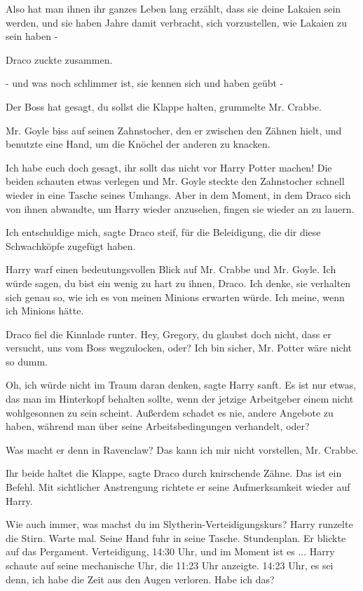 \glqq{}Also hat man ihnen ihr ganzes Leben lang erzählt, dass sie deine Lakaien
sein werden, und sie haben Jahre damit verbracht, sich vorzustellen, wie Lakaien
zu sein haben -\grqq{}

Draco zuckte zusammen.

\glqq{}- und was noch schlimmer ist, sie kennen sich und haben geübt -\grqq{}

\glqq{}Der Boss hat gesagt, du sollst die Klappe halten\grqq{}, grummelte Mr.
Crabbe.

Mr. Goyle biss auf seinen Zahnstocher, den er zwischen den Zähnen hielt, und
benutzte eine Hand, um die Knöchel der anderen zu knacken.

\glqq{}Ich habe euch doch gesagt, ihr sollt das nicht vor Harry Potter
machen!\grqq{} Die beiden schauten etwas verlegen und Mr. Goyle steckte den
Zahnstocher schnell wieder in eine Tasche seines Umhangs. Aber in dem Moment, in
dem Draco sich von ihnen abwandte, um Harry wieder anzusehen, fingen sie wieder
an zu lauern.

\glqq{}Ich entschuldige mich\grqq{}, sagte Draco steif, \glqq{}für die
Beleidigung, die dir diese Schwachköpfe zugefügt haben.\grqq{}

Harry warf einen bedeutungsvollen Blick auf Mr. Crabbe und Mr. Goyle. \glqq{}Ich
würde sagen, du bist ein wenig zu hart zu ihnen, Draco. Ich denke, sie verhalten
sich genau so, wie ich es von meinen Minions erwarten würde. Ich meine, wenn ich
Minions hätte.\grqq{}

Draco fiel die Kinnlade runter. \glqq{}Hey, Gregory, du glaubst doch nicht, dass
er versucht, uns vom Boss wegzulocken, oder?\grqq{} \glqq{}Ich bin sicher, Mr.
Potter wäre nicht so dumm.\grqq{}

\glqq{}Oh, ich würde nicht im Traum daran denken\grqq{}, sagte Harry sanft. \glqq{}
Es ist nur etwas, das man im Hinterkopf behalten sollte, wenn der jetzige
Arbeitgeber einem nicht wohlgesonnen zu sein scheint. Außerdem schadet es nie,
andere Angebote zu haben, während man über seine Arbeitsbedingungen verhandelt,
oder?\grqq{}

\glqq{}Was macht er denn in Ravenclaw?\grqq{} \glqq{}Das kann ich mir nicht
vorstellen, Mr. Crabbe.\grqq{}

\glqq{}Ihr beide haltet die Klappe\grqq{}, sagte Draco durch knirschende Zähne.
\glqq{}Das ist ein Befehl.\grqq{} Mit sichtlicher Anstrengung richtete er seine
Aufmerksamkeit wieder auf Harry.

\glqq{}Wie auch immer, was machst du im Slytherin-Verteidigungskurs?\grqq{} Harry
runzelte die Stirn. \glqq{}Warte mal.\grqq{} Seine Hand fuhr in seine Tasche.
\glqq{}Stundenplan.\grqq{} Er blickte auf das Pergament. \glqq{}Verteidigung,
14:30 Uhr, und im Moment ist es ...\grqq{} Harry schaute auf seine mechanische
Uhr, die 11:23 Uhr anzeigte. \glqq{}14:23 Uhr, es sei denn, ich habe die Zeit aus
den Augen verloren. Habe ich das?\grqq{}

